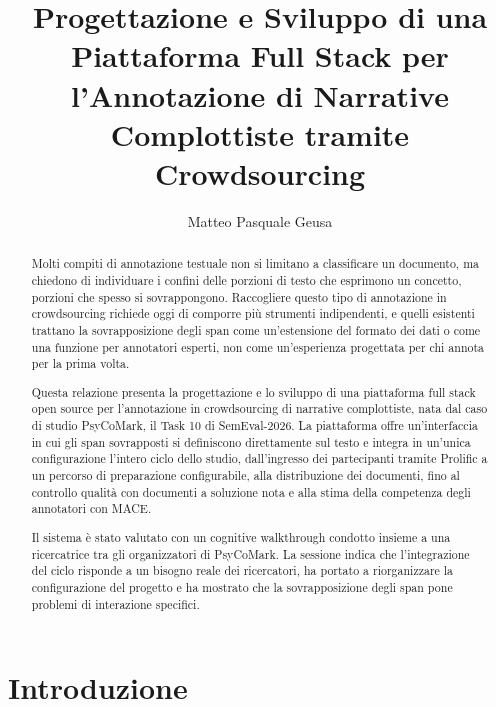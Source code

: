 \documentclass[]{sapthesis}
\title{Progettazione e Sviluppo di una Piattaforma Full Stack per l'Annotazione di Narrative Complottiste tramite Crowdsourcing}
\author{Matteo Pasquale Geusa}
\begin{document}
\frontmatter
\makeatletter
\renewcommand{\SAP@sapthesisInformationLabel}{Questa relazione di tirocinio \`e stata composta con \LaTeX\ e la classe Sapthesis}
\makeatother
\maketitle

\dedication{Dedicato a me, di qualche anno fa.}

\begin{abstract}
Molti compiti di annotazione testuale non si limitano a classificare un documento, ma chiedono di individuare i confini delle porzioni di testo che esprimono un concetto, porzioni che spesso si sovrappongono. Raccogliere questo tipo di annotazione in crowdsourcing richiede oggi di comporre più strumenti indipendenti, e quelli esistenti trattano la sovrapposizione degli span come un'estensione del formato dei dati o come una funzione per annotatori esperti, non come un'esperienza progettata per chi annota per la prima volta.

Questa relazione presenta la progettazione e lo sviluppo di una piattaforma full stack open source per l'annotazione in crowdsourcing di narrative complottiste, nata dal caso di studio PsyCoMark, il Task 10 di SemEval-2026. La piattaforma offre un'interfaccia in cui gli span sovrapposti si definiscono direttamente sul testo e integra in un'unica configurazione l'intero ciclo dello studio, dall'ingresso dei partecipanti tramite Prolific a un percorso di preparazione configurabile, alla distribuzione dei documenti, fino al controllo qualità con documenti a soluzione nota e alla stima della competenza degli annotatori con MACE.

Il sistema è stato valutato con un cognitive walkthrough condotto insieme a una ricercatrice tra gli organizzatori di PsyCoMark. La sessione indica che l'integrazione del ciclo risponde a un bisogno reale dei ricercatori, ha portato a riorganizzare la configurazione del progetto e ha mostrato che la sovrapposizione degli span pone problemi di interazione specifici.

\end{abstract}

\tableofcontents

\mainmatter



\chapter{Introduzione}
\label{cap:introduzione}
\end{document}
